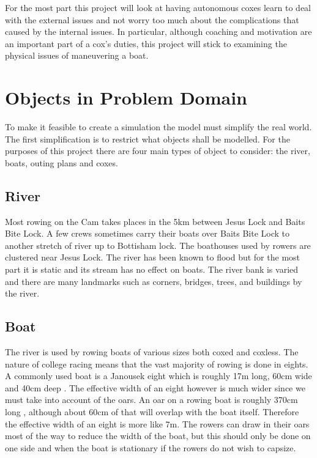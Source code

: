 For the most part this project will look at having autonomous coxes
learn to deal with the external issues and not worry too much about
the complications that caused by the internal issues. In particular,
although coaching and motivation are an important part of a cox's
duties, this project will stick to examining the physical issues of maneuvering a boat.

\section{Objects in Problem Domain}\label{sop:objuni}

To make it feasible to create a simulation the model must simplify the real world. The first simplification is to restrict what objects shall be modelled. For the purposes of this project there are four main types of object to consider: the river, boats, outing plans and coxes. 

\subsection{River} \label{riversubsec}
Most rowing on the Cam takes places in the 5km between Jesus Lock and
Baits Bite Lock. A few crews sometimes carry
their boats over Baits Bite Lock to another stretch of river up to
Bottisham lock. The boathouses used by rowers are clustered near Jesus
Lock. The river has been known to flood but for the most
part it is static and its stream has no effect on boats. The river bank is
varied and there are many landmarks
such as corners, bridges, trees, and buildings by the river.

\subsection{Boat}
The river is used by rowing boats
of various sizes both coxed and coxless. The nature of
college racing means that the vast majority of rowing is done in
eights. A commonly used boat is a Janousek eight which is roughly 17m long, 60cm wide and 40cm deep
\cite{Janousek}. The effective width of an eight however is much wider
since we must take into account of the oars. An oar on a rowing boat
is roughly 370cm long \cite{Concept2}, although about 60cm of that
will overlap with the boat itself. Therefore the effective width of an
eight is more like 7m. The rowers can draw in their oars most of the
way to reduce the width of the boat, but this should only be done on
one side and when the boat is stationary if the rowers do not wish to
capsize.

